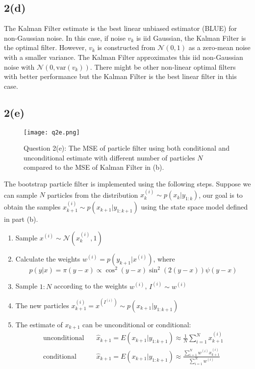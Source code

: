 \documentclass[a4paper, 11pt]{article}
\begin{document}
\subsection*{2(d)}

The Kalman Filter estimate is the best linear unbiased estimator (BLUE) for non-Gaussian noise. In this case, if noise $v_k$ is iid Gaussian, the Kalman Filter is the optimal filter. However, $v_k$ is constructed from $\mathcal{N}(0,1)$ as a zero-mean noise with a smaller variance. The Kalman Filter approximates this iid non-Gaussian noise with $\mathcal{N}(0, \text{var}(v_k))$. There might be other non-linear optimal filters with better performance but the Kalman Filter is the best linear filter in this case. 



\subsection*{2(e)}

\begin{figure}
	\begin{center}
		\texttt{[image: q2e.png]}
		\caption{Question 2(e): The MSE of particle filter using both conditional and unconditional estimate with different number of particles $N$ compared to the MSE of Kalman Filter in (b). }
	\end{center}
\end{figure}

The bootstrap particle filter is implemented using the following steps. Suppose we can sample $N$ particles from the distribution $x^{(i)}_k\sim p(x_k|y_{1:k})$, our goal is to obtain the samples $x^{(i)}_{k+1}\sim p(x_{k+1}|y_{1:k+1})$ using the state space model defined in part (b).
\begin{enumerate}
\item Sample $x^{(i)} \sim \mathcal{N}(x^{(i)}_k, 1)$
\item Calculate the weights $w^{(i)} = p(y_{k+1}|x^{(i)})$, where 
\begin{equation}
p(y|x) = \pi(y-x) \propto \cos^2(y-x)\sin^2(2(y-x))\psi(y-x)
\end{equation} 
\item Sample $1:N$ according to the weights $w^{(i)}$, $I^{(i)}\sim w^{(i)}$
\item The new particles $x^{(i)}_{k+1} = x^{(I^{(i)})} \sim p(x_{k+1}|y_{1:k+1})$
\item The estimate of $x_{k+1}$ can be unconditional or conditional:
\begin{equation}
\begin{split}
\text{unconditional} & \quad\hat{x}_{k+1} = E(x_{k+1}|y_{1:k+1}) \approx \frac{1}{N}\sum_{i=1}^N x^{(i)}_{k+1}\\
\text{conditional} & \quad\hat{x}_{k+1} = E(x_{k+1}|y_{1:k+1}) \approx \frac{\sum_{i=1}^N w^{(i)}x^{(i)}_{k+1}}{\sum_{i=1}^N w^{(i)}}\\
\end{split}
\end{equation} 
\end{enumerate}
\end{document}
